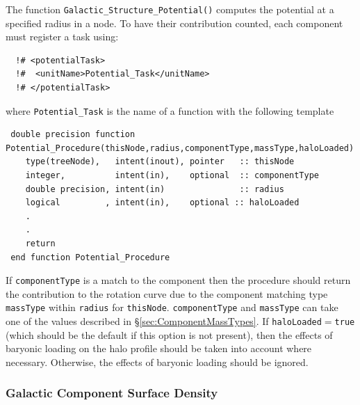 The function {\tt Galactic\_Structure\_Potential()} computes the potential at a specified radius in a node. To have their contribution counted, each component must register a task using:
\begin{verbatim}
  !# <potentialTask>
  !#  <unitName>Potential_Task</unitName>
  !# </potentialTask>
\end{verbatim}
where {\tt Potential\_Task} is the name of a function with the following template
\begin{verbatim}
 double precision function Potential_Procedure(thisNode,radius,componentType,massType,haloLoaded)
    type(treeNode),   intent(inout), pointer   :: thisNode
    integer,          intent(in),    optional  :: componentType  
    double precision, intent(in)               :: radius
    logical         , intent(in),    optional :: haloLoaded
    .
    .
    return
 end function Potential_Procedure
\end{verbatim}
If {\tt componentType} is a match to the component then the procedure should return the contribution to the rotation curve due to the component matching type {\tt massType} within {\tt radius} for {\tt thisNode}. {\tt componentType} and {\tt massType} can take one of the values described in \S\ref{sec:ComponentMassTypes}. If {\tt haloLoaded}$=${\tt true} (which should be the default if this option is not present), then the effects of baryonic loading on the halo profile should be taken into account where necessary. Otherwise, the effects of baryonic loading should be ignored.

\subsubsection{Galactic Component Surface Density}


